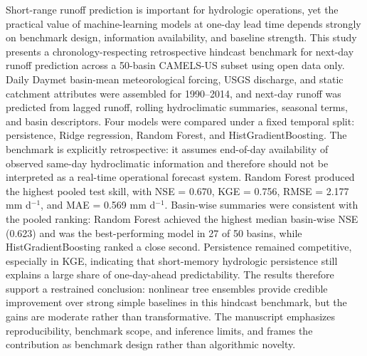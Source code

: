 Short-range runoff prediction is important for hydrologic operations, yet the practical value of machine-learning models at one-day lead time depends strongly on benchmark design, information availability, and baseline strength. This study presents a chronology-respecting retrospective hindcast benchmark for next-day runoff prediction across a 50-basin CAMELS-US subset using open data only. Daily Daymet basin-mean meteorological forcing, USGS discharge, and static catchment attributes were assembled for 1990--2014, and next-day runoff was predicted from lagged runoff, rolling hydroclimatic summaries, seasonal terms, and basin descriptors. Four models were compared under a fixed temporal split: persistence, Ridge regression, Random Forest, and HistGradientBoosting. The benchmark is explicitly retrospective: it assumes end-of-day availability of observed same-day hydroclimatic information and therefore should not be interpreted as a real-time operational forecast system. Random Forest produced the highest pooled test skill, with NSE = 0.670, KGE = 0.756, RMSE = 2.177 mm d$^{-1}$, and MAE = 0.569 mm d$^{-1}$. Basin-wise summaries were consistent with the pooled ranking: Random Forest achieved the highest median basin-wise NSE (0.623) and was the best-performing model in 27 of 50 basins, while HistGradientBoosting ranked a close second. Persistence remained competitive, especially in KGE, indicating that short-memory hydrologic persistence still explains a large share of one-day-ahead predictability. The results therefore support a restrained conclusion: nonlinear tree ensembles provide credible improvement over strong simple baselines in this hindcast benchmark, but the gains are moderate rather than transformative. The manuscript emphasizes reproducibility, benchmark scope, and inference limits, and frames the contribution as benchmark design rather than algorithmic novelty.
